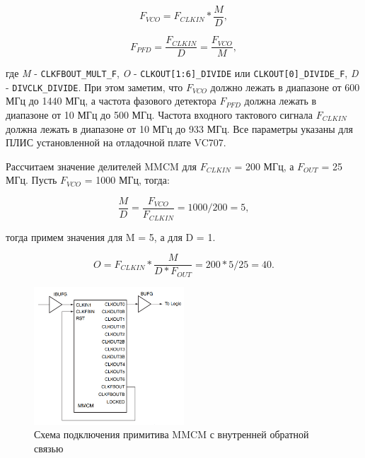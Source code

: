 \documentclass[a4paper,oneside ,14pt]{extreport}
\begin{document}
\begin{equation}	
	F_{VCO} =  F_{CLKIN} * \frac{M}{D},
\end{equation}

\begin{equation}	
	F_{PFD} =  \frac{F_{CLKIN}}{D} = \frac{F_{VCO}}{M},
\end{equation}

где \textit{M} - \verb|CLKFBOUT_MULT_F|, \textit{O} - \verb|CLKOUT[1:6]_DIVIDE| или \verb|CLKOUT[0]_DIVIDE_F|, \textit{D} - \verb|DIVCLK_DIVIDE|. 	 
При этом заметим, что \(F_{VCO}\) должно лежать в диапазоне от 600 МГц до 1440 МГц, а частота фазового детектора \(F_{PFD}\) должна лежать в диапазоне от 10 МГц до 500 МГц. Частота входного
тактового сигнала \(F_{CLKIN}\) должна лежать в диапазоне от 10 МГц до 933 МГц. Все параметры указаны для ПЛИС установленной на отладочной плате VC707.  

Рассчитаем значение делителей MMCM для \(F_{CLKIN}\) = 200 МГц, а \(F_{OUT}\) = 25 МГц. Пусть \(F_{VCO}\) = 1000 МГц, тогда:

\begin{equation}	
	 \frac{M}{D}  =  \frac{F_{VCO}}{F_{CLKIN}} = 1000/200 = 5,
\end{equation}

тогда примем значения для M = 5, а для D = 1.

\begin{equation}	
	O =  F_{CLKIN} * \frac{M}{D*F_{OUT}} = 200 * 5 / 25 = 40.
\end{equation}

\begin{figure}[!ht]
	\centering
	\includegraphics[width=0.5\textwidth]{image/MMCM_INT.PNG}
	\caption{Схема подключения примитива MMCM с внутренней обратной связью}
	\label{fig::MMCM_INT}
\end{figure}
\end{document}
